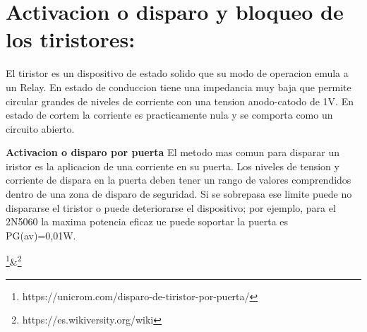 \documentclass[11pt]{article}
\begin{document}
\section{Activacion o disparo y bloqueo de los tiristores:}
El tiristor es un dispositivo de estado solido que su modo de operacion emula a un Relay. En estado de conduccion tiene una impedancia muy baja que permite circular grandes de niveles de corriente con una tension anodo-catodo de 1V. En estado de cortem la corriente es practicamente nula y se comporta como un circuito abierto.

\textbf{Activacion o disparo por puerta}
El metodo mas comun para disparar un iristor es la aplicacion de una corriente en su puerta. Los niveles de tension y corriente de dispara en la puerta deben tener un rango de valores comprendidos dentro de una zona de disparo de seguridad. Si se sobrepasa ese limite puede no dispararse el tiristor o puede deteriorarse el dispositivo; por ejemplo, para el 2N5060 la maxima potencia eficaz ue puede soportar la puerta es PG(av)=0,01W.


\footnote{https://unicrom.com/disparo-de-tiristor-por-puerta/}\&\footnote{https://es.wikiversity.org/wiki}
\end{document}
